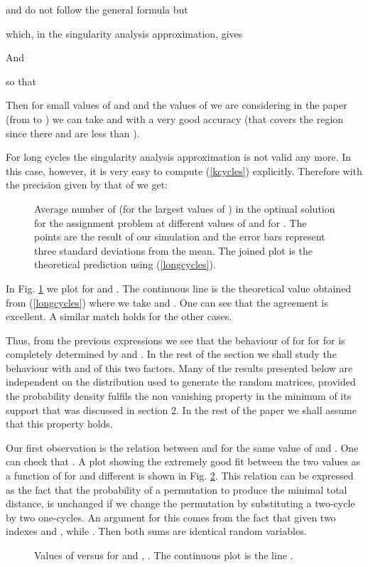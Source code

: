 \documentclass[]{iopart}
\begin{document}
 and  do not follow the general formula but
 
which, in the singularity analysis approximation, gives

And 
 
so that

Then for small values of  and  and the values of
 we are considering in the paper (from  to )
we can take  and  with a very good 
accuracy (that covers the  region since there  and 
 are less than ).

For long cycles  the singularity analysis approximation 
is not valid any
more. In this case, however, it is very easy to compute (\ref{kcycles}) 
explicitly.
Therefore with the precision given by that of 
 we get:


\begin{figure}[h!]

\caption{\small Average number of  (for the largest values of ) 
in the optimal solution for
  the assignment problem at different values of  and for .
  The points are the result of our simulation and the error bars represent
 three standard deviations from the mean. The joined plot is the theoretical
 prediction  using  (\ref{longcycles}).}
\label{teornm2}
\end{figure}


In Fig. \ref{teornm2} we plot  for  and  . The continuous
line is the theoretical value obtained from (\ref{longcycles})
where we take  and . One can see
that the agreement is excellent. A similar match holds for the 
other cases.

Thus, from the previous expressions
we see that the behaviour of  for for   
for 
is completely determined by  and . In the rest of the section 
we shall study the behaviour with  and  of this two factors.
Many of the results presented below
are independent on the distribution 
used to generate the random matrices, provided
the probability density fulfils the non vanishing
property in the minimum  of its support that was discussed
in section 2. In the rest of the paper we shall assume that this property
holds.

Our first observation is the relation between  and 
 for the same value of  and .
One can check that .
A plot showing the extremely good fit between the two values as a function of
 for  and different  is shown in Fig. \ref{q1q2}.
This relation can be expressed as the fact that the probability of
a permutation to produce the minimal total distance,
is unchanged if we change the permutation by substituting 
a two-cycle by two one-cycles. 
An argument for this comes from the fact
that given two indexes  and ,  while 
. Then both
sums are identical random variables.
\begin{figure}[h!]
\caption{\small Values of  versus  for  and
 , . The continuous plot is the line .}
\label{q1q2}
\end{figure}
\end{document}
